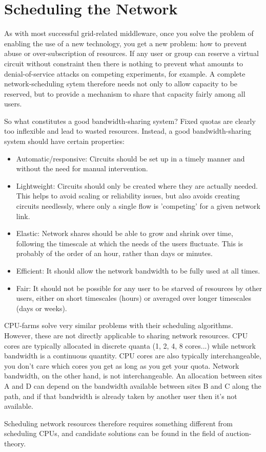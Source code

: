 \section{Scheduling the Network}

As with most successful grid-related middleware, once you solve the problem of enabling the use of a new technology, you get a new problem: how to prevent abuse or over-subscription of resources. If any user or group can reserve a virtual circuit without constraint then there is nothing to prevent what amounts to denial-of-service attacks on competing experiments, for example. A complete network-scheduling sytem therefore needs not only to allow capacity to be reserved, but to provide a mechanism to share that capacity fairly among all users.

So what constitutes a good bandwidth-sharing system? Fixed quotas are clearly too inflexible and lead to wasted resources. Instead, a good bandwidth-sharing system should have certain properties:

\begin{itemize}
\item Automatic/responsive: Circuits should be set up in a timely manner and without the need for manual intervention.
\item Lightweight: Circuits should only be created where they are actually needed. This helps to avoid scaling or reliability issues, but also avoids creating circuits needlessly, where only a single flow is 'competing' for a given network link.
\item Elastic: Network shares should be able to grow and shrink over time, following the timescale at which the needs of the users fluctuate. This is probably of the order of an hour, rather than days or minutes.
\item Efficient: It should allow the network bandwidth to be fully used at all times.
\item Fair: It should not be possible for any user to be starved of resources by other users, either on short timescales (hours) or averaged over longer timescales (days or weeks).
\end{itemize}

CPU-farms solve very similar problems with their scheduling algorithms. However, these are not directly applicable to sharing network resources. CPU cores are typically allocated in discrete quanta (1, 2, 4, 8 cores...) while network bandwidth is a continuous quantity. CPU cores are also typically interchangeable, you don't care which cores you get as long as you get your quota. Network bandwidth, on the other hand, is not interchangeable. An allocation between sites A and D can depend on the bandwidth available between sites B and C along the path, and if that bandwidth is already taken by another user then it's not available.

Scheduling network resources therefore requires something different from scheduling CPUs, and candidate solutions can be found in the field of auction-theory.